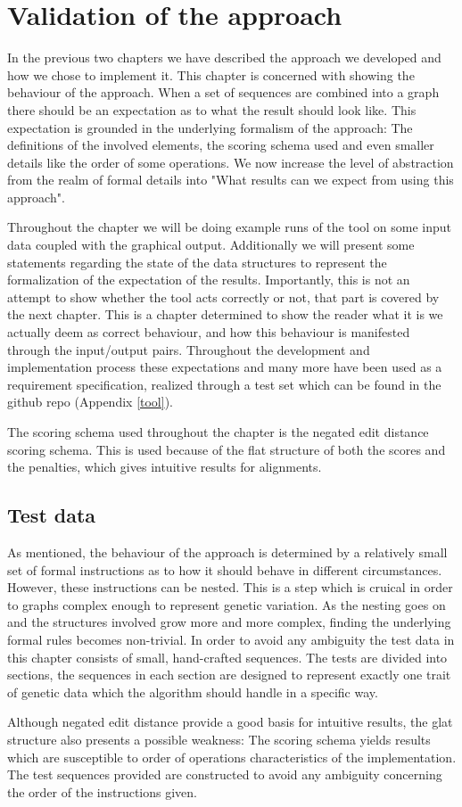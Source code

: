 \documentclass[thesis.tex]{subfiles}
\begin{document}
\chapter{Validation of the approach}
In the previous two chapters we have described the approach we developed and how we chose to implement it. This chapter is concerned with showing the behaviour of the approach. When a set of sequences are combined into a graph there should be an expectation as to what the result should look like. This expectation is grounded in the underlying formalism of the approach: The definitions of the involved elements, the scoring schema used and even smaller details like the order of some operations. We now increase the level of abstraction from the realm of formal details into "What results can we expect from using this approach".\\
\par\noindent
Throughout the chapter we will be doing example runs of the tool on some input data coupled with the graphical output. Additionally we will present some statements regarding the state of the data structures to represent the formalization of the expectation of the results. Importantly, this is not an attempt to show whether the tool acts correctly or not, that part is covered by the next chapter. This is a chapter determined to show the reader what it is we actually deem as correct behaviour, and how this behaviour is manifested through the input/output pairs. Throughout the development and implementation process these expectations and many more have been used as a requirement specification, realized through a test set which can be found in the github repo (Appendix \ref{tool}).\\
\par\noindent
The scoring schema used throughout the chapter is the negated edit distance scoring schema. This is used because of the flat structure of both the scores and the penalties, which gives intuitive results for alignments. 
\section{Test data}
As mentioned, the behaviour of the approach is determined by a relatively small set of formal instructions as to how it should behave in different circumstances. However, these instructions can be nested. This is a step which is cruical in order to graphs complex enough to represent genetic variation. As the nesting goes on and the structures involved grow more and more complex, finding the underlying formal rules becomes non-trivial. In order to avoid any ambiguity the test data in this chapter consists of small, hand-crafted sequences. The tests are divided into sections, the sequences in each section are designed to represent exactly one trait of genetic data which the algorithm should handle in a specific way.\\
\par\noindent
Although negated edit distance provide a good basis for intuitive results, the glat structure also presents a possible weakness: The scoring schema yields results which are susceptible to order of operations characteristics of the implementation. The test sequences provided are constructed to avoid any ambiguity concerning the order of the instructions given.
\end{document}
